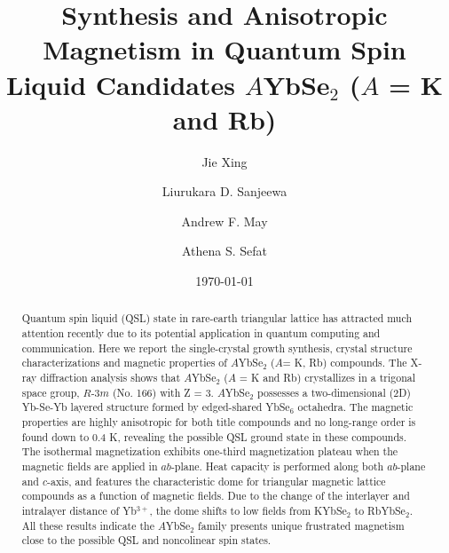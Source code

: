 \documentclass[%
 aip,
 amsmath,amssymb,
 reprint,%
]{revtex4-1}
\begin{document}

\title{Synthesis and Anisotropic Magnetism in Quantum Spin Liquid Candidates $A$YbSe$_2$ ($A$ = K and Rb)}
\author{Jie Xing}
%
\author{Liurukara D. Sanjeewa}
%
\author{Andrew F. May}
%
\author{Athena S. Sefat}
%
\date{\today}%

\begin{abstract}
Quantum spin liquid (QSL) state in rare-earth triangular lattice has attracted much attention recently due to its potential application in quantum computing and communication. Here we report the single-crystal growth synthesis, crystal structure characterizations and magnetic properties of $A$YbSe$_{2}$ ($A$= K, Rb) compounds. The X-ray diffraction analysis shows that $A$YbSe$_{2}$ ($A$ = K and Rb) crystallizes in a trigonal space group, $R$-3$m$ (No. 166) with Z = 3. $A$YbSe$_{2}$ possesses a two-dimensional (2D) Yb-Se-Yb layered structure formed by edged-shared YbSe$_6$ octahedra. The magnetic properties are highly anisotropic for both title compounds and no long-range order is found down to 0.4 K, revealing the possible QSL ground state in these compounds. The isothermal magnetization exhibits one-third magnetization plateau when the magnetic fields are applied in $ab$-plane. Heat capacity is performed along both $ab$-plane and $c$-axis, and features the characteristic dome for triangular magnetic lattice compounds as a function of magnetic fields. Due to the change of the interlayer and intralayer distance of Yb$^{3+}$, the dome shifts to low fields from KYbSe$_2$ to RbYbSe$_2$. All these results indicate the $A$YbSe$_2$ family presents unique frustrated magnetism close to the possible QSL and noncolinear spin states.
\end{abstract}
\end{document}
